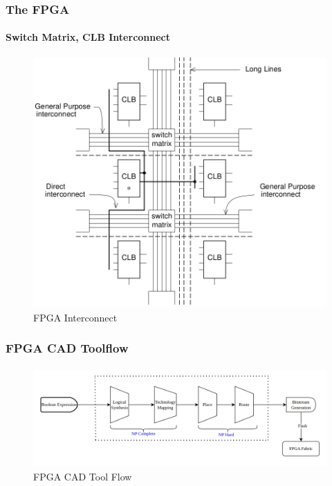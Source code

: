 \documentclass{beamer}
\begin{document}
{\begin{frame}[fragile]
  \frametitle{The FPGA}
  \framesubtitle{Switch Matrix, CLB Interconnect}
  \begin{figure}
    \centering
    \includegraphics[width=0.8\linewidth]{images/XC2000_inter.png}
    \caption{FPGA Interconnect}
    \label{exa_interconnect}
  \end{figure}
\end{frame}

\begin{frame}[fragile]
  \frametitle{FPGA CAD Toolflow}
  \framesubtitle{}
   \begin{figure}
        \centering
        \includegraphics[width=1\linewidth]{images/cad_flow.png}
        \caption{FPGA CAD Tool Flow}
        \label{exa_cadflow}
    \end{figure}
\end{frame}


}
\end{document}
